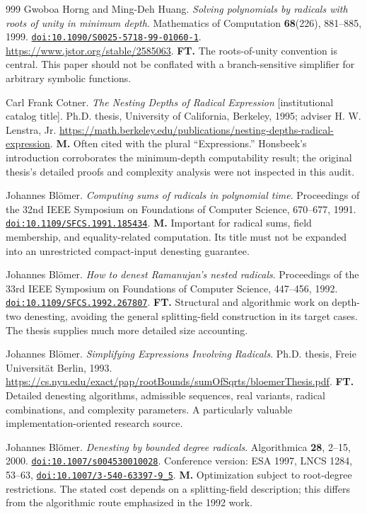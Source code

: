 \documentclass[11pt,a4paper]{article}
\newcommand{\doi}[1]{\href{https://doi.org/#1}{\nolinkurl{doi:#1}}}
\let\sourceurl\url
\theoremstyle{definition}
\theoremstyle{remark}
\numberwithin{equation}{section}
\begin{document}
\begin{thebibliography}{999}
Gwoboa Horng and Ming-Deh Huang.
\emph{Solving polynomials by radicals with roots of unity in minimum depth}.
Mathematics of Computation \textbf{68}(226), 881--885, 1999.
\doi{10.1090/S0025-5718-99-01060-1}.
\sourceurl{https://www.jstor.org/stable/2585063}.
\textbf{FT.} The roots-of-unity convention is central. This paper should not be conflated with a branch-sensitive simplifier for arbitrary symbolic functions.

Carl Frank Cotner.
\emph{The Nesting Depths of Radical Expression} [institutional catalog title].
Ph.D. thesis, University of California, Berkeley, 1995; adviser H. W. Lenstra, Jr.
\sourceurl{https://math.berkeley.edu/publications/nesting-depths-radical-expression}.
\textbf{M.} Often cited with the plural ``Expressions.'' Honsbeek's introduction corroborates the minimum-depth computability result; the original thesis's detailed proofs and complexity analysis were not inspected in this audit.

Johannes Bl\"omer.
\emph{Computing sums of radicals in polynomial time}.
Proceedings of the 32nd IEEE Symposium on Foundations of Computer Science, 670--677, 1991.
\doi{10.1109/SFCS.1991.185434}.
\textbf{M.} Important for radical sums, field membership, and equality-related computation. Its title must not be expanded into an unrestricted compact-input denesting guarantee.

Johannes Bl\"omer.
\emph{How to denest Ramanujan's nested radicals}.
Proceedings of the 33rd IEEE Symposium on Foundations of Computer Science, 447--456, 1992.
\doi{10.1109/SFCS.1992.267807}.
\textbf{FT.} Structural and algorithmic work on depth-two denesting, avoiding the general splitting-field construction in its target cases. The thesis supplies much more detailed size accounting.

Johannes Bl\"omer.
\emph{Simplifying Expressions Involving Radicals}.
Ph.D. thesis, Freie Universit\"at Berlin, 1993.
\sourceurl{https://cs.nyu.edu/exact/pap/rootBounds/sumOfSqrts/bloemerThesis.pdf}.
\textbf{FT.} Detailed denesting algorithms, admissible sequences, real variants, radical combinations, and complexity parameters. A particularly valuable implementation-oriented research source.

Johannes Bl\"omer.
\emph{Denesting by bounded degree radicals}.
Algorithmica \textbf{28}, 2--15, 2000.
\doi{10.1007/s004530010028}.
Conference version: ESA 1997, LNCS 1284, 53--63, \doi{10.1007/3-540-63397-9_5}.
\textbf{M.} Optimization subject to root-degree restrictions. The stated cost depends on a splitting-field description; this differs from the algorithmic route emphasized in the 1992 work.


\end{thebibliography}
\end{document}
